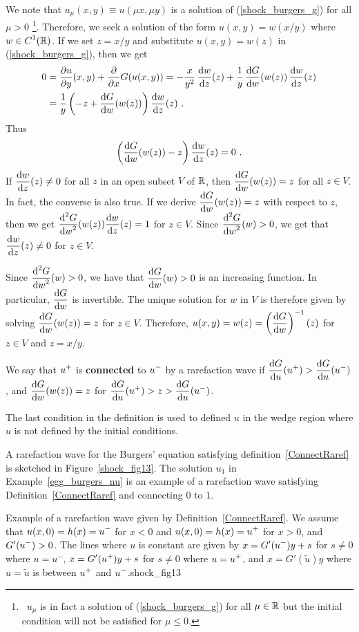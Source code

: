 We note that $u_\mu(x,y) \equiv u(\mu x, \mu y)$ is a solution of
(\ref{shock_burgers_g}) for all $\mu >0$ \footnote{\ $u_\mu$ is in fact a
solution of (\ref{shock_burgers_g}) for all $\mu \in \RR$ but the
initial condition will not be satisfied for $\mu \leq 0$.}.
Therefore, we seek a solution of the form $u(x,y) = w(x/y)$ where
$\DS w \in C^1(\RR)$.  If we set $z = x/y$ and
substitute $u(x,y) = w(z)$ in (\ref{shock_burgers_g}), then we get
\begin{align*}
0 &= \pdydx{u}{y}(x,y) + \pdfdx{G(u(x,y))}{x}
= -\frac{x}{y^2}\, \dydx{w}{z}(z) + \frac{1}{y}\,\dydx{G}{w}(w(z))
\, \dydx{w}{z}(z)  \\
&= \frac{1}{y} \left( -z + \dydx{G}{w}(w(z)) \right) \dydx{w}{z}(z) \ .
\end{align*}
Thus
\[
\left(\dydx{G}{w}(w(z)) - z \right) \dydx{w}{z}(z) = 0 \ .
\]
If $\DS \dydx{w}{z}(z) \neq 0$ for all $z$ in an open
subset $V$ of $\RR$, then
$\DS \dydx{G}{w}(w(z)) = z$ for all $z\in V$.  In fact, the
converse is also true.  If we derive $\DS \dydx{G}{w}(w(z)) = z$
with respect to $z$, then we get
$\DS \dydxn{G}{w}{2}(w(z))\dydx{w}{z}(z) = 1$ for $z\in V$.  Since
$\DS \dydxn{G}{w}{2}(w) > 0$, we get that 
$\DS \dydx{w}{z}(z) \neq 0$ for $z \in V$.

Since $\DS \dydxn{G}{w}{2}(w) > 0$, we have that
$\DS \dydx{G}{w}(w) > 0$ is an increasing function.
In particular, $\DS \dydx{G}{w}$ is invertible.  The
unique solution for $w$ in $V$ is therefore given by solving
$\DS \dydx{G}{w}(w(z)) = z$ for $z \in V$.
Therefore, $\DS u(x,y) = w(z) = \left(\dydx{G}{w}\right)^{-1}(z)$
for $z \in V$ and $z = x/y$.

\begin{defn} \label{ConnectRaref}
We say that $\DS u^+$ is {\bfseries connected} to
$\DS u^-$ by a rarefaction
wave if $\DS \dydx{G}{u}(u^+) > \dydx{G}{u}(u^-)$, and
$\DS \dydx{G}{w}(w(z)) = z$ for
$\DS \dydx{G}{u}(u^+) > z > \dydx{G}{u}(u^-)$.
\end{defn}

The last condition in the definition is used to defined $u$ in the
wedge region where $u$ is not defined by the initial conditions.

A rarefaction wave for the Burgers' equation satisfying
definition~\ref{ConnectRaref} is sketched in Figure~\ref{shock_fig13}.
The solution $u_1$ in Example~\ref{egg_burgers_nu} is an example of a
rarefaction wave satisfying Definition~\ref{ConnectRaref} and
connecting $0$ to $1$.

{Example of a rarefaction wave given by Definition~\ref{ConnectRaref}.
We assume that $\DS u(x,0) = h(x) = u^-$ for $x<0$ and
$\DS u(x,0) = h(x) = u^+$ for $x>0$, and
$\DS G'(u^-)>0$.  The lines where $u$
is constant are given by $\DS x= G'(u^-) y + s$ for
$s\neq 0$ where $u = u^-$,
$\DS x= G'(u^+) y + s$ for $s\neq 0$ where $\DS u = u^+$,
and $x = G'(\tilde{u}) y$ where $u = \tilde{u}$ is between
$\DS u^+$ and $\DS u^-$.}{shock_fig13}

